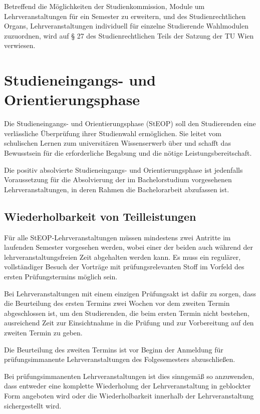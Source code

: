 Betreffend die Möglichkeiten der Studienkommission, Module um
Lehrveranstaltungen für ein Semester zu erweitern, und des
Studienrechtlichen Organs, Lehrveranstaltungen individuell für
einzelne Studierende Wahlmodulen zuzuordnen, wird auf § 27
des Studienrechtlichen Teils der Satzung der TU Wien verwiesen.

\section{Studieneingangs- und Orientierungsphase}\label{sec:STEOP}

Die Studieneingangs- und Orientierungsphase (StEOP) soll den
Studierenden eine verlässliche Überprüfung ihrer Studienwahl
ermöglichen. Sie leitet vom schulischen Lernen zum universitären
Wissenserwerb über und schafft das Bewusstsein für die erforderliche
Begabung und die nötige Leistungsbereitschaft.

%

Die positiv absolvierte Studieneingangs- und Orientierungsphase ist
jedenfalls Voraussetzung für die Absolvierung der im Bachelorstudium
vorgesehenen Lehrveranstaltungen, in deren Rahmen die Bachelorarbeit
abzufassen ist.

\subsection*{Wiederholbarkeit von Teilleistungen}

Für alle StEOP-Lehrveranstaltungen müssen mindestens zwei Antritte im
laufenden Semester vorgesehen werden, wobei einer der beiden auch
während der lehrveranstaltungsfreien Zeit abgehalten werden kann. Es
muss ein regulärer, vollständiger Besuch der Vorträge mit
prüfungsrelevanten Stoff im Vorfeld des ersten Prüfungstermins möglich
sein.

Bei Lehrveranstaltungen mit einem einzigen Prüfungsakt ist dafür zu
sorgen, dass die Beurteilung des ersten Termins zwei Wochen vor dem
zweiten Termin abgeschlossen ist, um den Studierenden, die beim ersten
Termin nicht bestehen, ausreichend Zeit zur Einsichtnahme in die
Prüfung und zur Vorbereitung auf den zweiten Termin zu geben.

Die Beurteilung des zweiten Termins ist vor Beginn der Anmeldung für
prüfungsimmanente Lehrveranstaltungen des Folgesemesters
abzuschließen.

Bei prüfungsimmanenten Lehrveranstaltungen ist dies sinngemäß so
anzuwenden, dass entweder eine komplette Wiederholung der
Lehrveranstaltung in geblockter Form angeboten wird oder die
Wiederholbarkeit innerhalb der Lehrveranstaltung sichergestellt
wird.

